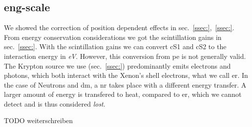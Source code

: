 
\FloatBarrier
\subsection{eng-scale}
\label{ssec:eng-scale}
\FloatBarrier


We showed the correction of position dependent effects in sec.~\ref{ssec:},~\ref{ssec:}.  %
From energy conservation considerations we got the scintillation gains in sec.~\ref{ssec:}.  %
With the scintillation gains we can convert cS1 and cS2 to the interaction energy in \textit{eV}.
However, this conversion from \gls{pe} is not generally valid.
The Krypton source we use (sec.~\ref{ssec:}) predominantly emits electrons and photons, which both interact with the Xenon's shell electrons, what we call \gls{er}. %
In the case of Neutrons and \gls{dm}, a \gls{nr} takes place with a different energy transfer.
A larger amount of energy is transfered to heat, compared to \gls{er}, which we cannot detect and is thus considered \emph{lost}.

TODO weiterschreiben




